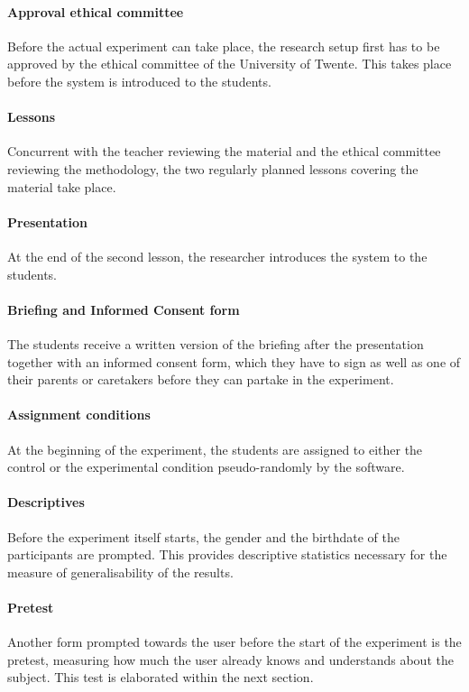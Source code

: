 \paragraph{Approval ethical committee} Before the actual experiment can take place, the research setup first has to be approved by the ethical committee of the University of Twente. This takes place before the system is introduced to the students.

\paragraph{Lessons} Concurrent with the teacher reviewing the material and the ethical committee reviewing the methodology, the two regularly planned lessons covering the material take place.

\paragraph{Presentation} At the end of the second lesson, the researcher introduces the system to the students.

\paragraph{Briefing and Informed Consent form} The students receive a written version of the briefing after the presentation together with an informed consent form, which they have to sign as well as one of their parents or caretakers before they can partake in the experiment.

\paragraph{Assignment conditions} At the beginning of the experiment, the students are assigned to either the control or the experimental condition pseudo-randomly by the software.

\paragraph{Descriptives} Before the experiment itself starts, the gender and the birthdate of the participants are prompted. This provides descriptive statistics necessary for the measure of generalisability of the results.

\paragraph{Pretest} Another form prompted towards the user before the start of the experiment is the pretest, measuring how much the user already knows and understands about the subject. This test is elaborated within the next section.

